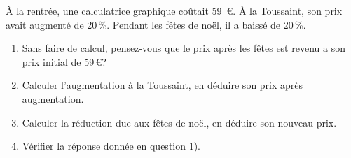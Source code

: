 \begin{exercice*}
   À la rentrée, une calculatrice graphique coûtait 59~\euro. À la Toussaint, son prix avait augmenté de 20\,\%. Pendant les fêtes de noël, il a baissé de 20\,\%.
   \begin{enumerate}
      \item Sans faire de calcul, pensez-vous que le prix après les fêtes est revenu a son prix initial de 59\,\euro ?
      \item Calculer l'augmentation à la Toussaint, en déduire son prix après augmentation.
      \item Calculer la réduction due aux fêtes de noël, en déduire son nouveau prix.
      \item Vérifier la réponse donnée en question 1).
   \end{enumerate}
\end{exercice*}
   